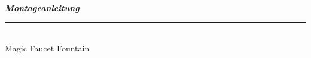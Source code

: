 %
%
%

\begin{titlepage}
    
    
    \begin{flushright}
        \vspace{2cm}
        \LARGE \textsl{\textbf{Montageanleitung}}\\
        \rule{0.6\textwidth}{0.4pt} ~\\
        \vspace{0.5cm}
        \textsf{\LARGE Magic Faucet Fountain}\\
    \end{flushright}
    
    \vspace{3cm}
    \large


\end{titlepage}
